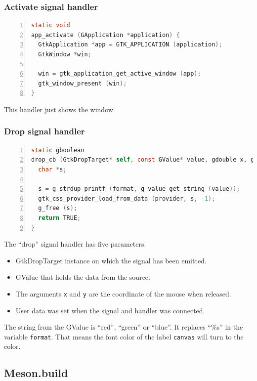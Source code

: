 \subsubsection{Activate signal handler}\label{activate-signal-handler}

\begin{lstlisting}[language=C, numbers=left]
static void
app_activate (GApplication *application) {
  GtkApplication *app = GTK_APPLICATION (application);
  GtkWindow *win;

  win = gtk_application_get_active_window (app);
  gtk_window_present (win);
}
\end{lstlisting}

This handler just shows the window.

\subsubsection{Drop signal handler}\label{drop-signal-handler}

\begin{lstlisting}[language=C, numbers=left]
static gboolean
drop_cb (GtkDropTarget* self, const GValue* value, gdouble x, gdouble y, gpointer user_data) {
  char *s;

  s = g_strdup_printf (format, g_value_get_string (value));
  gtk_css_provider_load_from_data (provider, s, -1);
  g_free (s);
  return TRUE;
}
\end{lstlisting}

The ``drop'' signal handler has five parameters.

\begin{itemize}
\tightlist
\item
  GtkDropTarget instance on which the signal has been emitted.
\item
  GValue that holds the data from the source.
\item
  The arguments \passthrough{\lstinline!x!} and
  \passthrough{\lstinline!y!} are the coordinate of the mouse when
  released.
\item
  User data was set when the signal and handler was connected.
\end{itemize}

The string from the GValue is ``red'', ``green'' or ``blue''. It
replaces ``\%s'' in the variable \passthrough{\lstinline!format!}. That
means the font color of the label \passthrough{\lstinline!canvas!} will
turn to the color.

\subsection{Meson.build}\label{meson.build}

